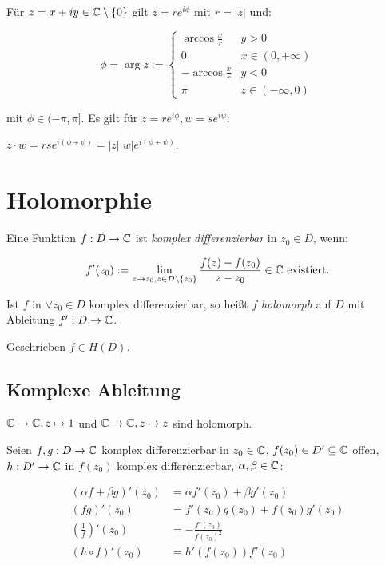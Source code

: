 Für $z = x +iy \in \mathbb{C} \setminus \{0\}$ gilt $z = re^{i\phi}$ mit $r = |z|$ und:

\vspace*{-2mm}
$$\phi = \arg z := \begin{cases}
	\arccos \frac{x}{r} & y > 0 \\
	0 & x \in (0,+\infty) \\
	-\arccos \frac{x}{r} & y < 0 \\
	\pi & z \in (-\infty,0)
\end{cases}$$

mit $\phi \in (-\pi, \pi]$. Es gilt für $z = re^{i\phi}, w = se^{i\psi}$:

$z \cdot w = rse^{i(\phi+\psi)} = |z||w|e^{i(\phi+\psi)}$.

\section*{Holomorphie}

Eine Funktion $f : D \to \mathbb{C}$ ist \emph{komplex differenzierbar} in $z_0 \in D$, wenn:

\vspace*{-4mm}
$$f'(z_0) := \displaystyle\lim_{z \to z_0, z \in D\setminus\{z_0\}} \frac{f(z)-f(z_0)}{z-z_0} \in \mathbb{C} \text{ existiert.}$$

Ist $f$ in $\forall z_0 \in D$ komplex differenzierbar, so heißt $f$ \emph{holomorph} auf $D$ mit Ableitung $f' : D \to \mathbb{C}$.

Geschrieben $f \in H(D)$.

\subsection*{Komplexe Ableitung}

$\mathbb{C} \to \mathbb{C}, z \mapsto 1$ und $\mathbb{C} \to \mathbb{C}, z \mapsto z$ sind holomorph.

Seien $f, g : D \to \mathbb{C}$ komplex differenzierbar in $z_0 \in \mathbb{C}$, $f(z_0) \in D' \subseteq \mathbb{C}$ offen, $h : D' \to \mathbb{C}$ in $f(z_0)$ komplex differenzierbar, $\alpha, \beta \in \mathbb{C}$:

\vspace*{-4mm}
\begin{align*}
	(\alpha f + \beta g)'(z_0) &= \alpha f'(z_0) + \beta g'(z_0) \\
	(fg)'(z_0) &= f'(z_0)g(z_0) + f(z_0)g'(z_0) \\
	\left(\frac{1}{f}\right)'(z_0) &= -\frac{f'(z_0)}{f(z_0)^2} \\
	(h \circ f)'(z_0) &= h'(f(z_0))f'(z_0)
\end{align*}

